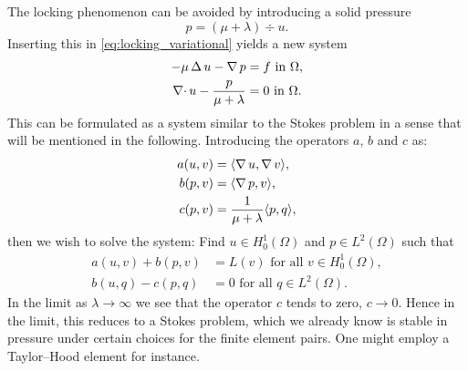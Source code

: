 The locking phenomenon can be avoided by introducing a solid pressure 
\begin{equation}
    p = (\mu + \lambda) \div u.
\end{equation}
Inserting this in \cref{eq:locking_variational} yields a new system
\begin{align}
    -\mu \operatorname{\mathop{}\!\Delta} u - \operatorname{\mathop{}\!\nabla} p &= f \text{ in } \Omega, \\
    \operatorname{\mathop{}\!\nabla \cdot} u - \frac{p}{\mu + \lambda} &= 0 \text{ in } \Omega.
\end{align}
This can be formulated as a system similar to the Stokes problem in a sense
that will be mentioned in the following. Introducing the operators \(a\), \(b\)
and \(c\) as:
\begin{align}
    a(u, v) &= \langle \operatorname{\mathop{}\!\nabla} u, \operatorname{\mathop{}\!\nabla} v  \rangle, \\
    b(p, v) &= \langle \operatorname{\mathop{}\!\nabla} p, v \rangle, \\
    c(p, v) &= \frac{1}{\mu+\lambda} \langle p, q \rangle, 
\end{align}
then we wish to solve the system: Find \( u \in H^1_0(\Omega) \) and \( p \in L^2(\Omega) \)
such that 
\begin{align}
    a(u, v) + b(p, v) &= L(v) \text{ for all } v \in H^1_0(\Omega), \\
    b(u, q) - c(p, q) &= 0 \text{ for all } q \in L^2(\Omega).
\end{align}
In the limit as \( \lambda \to \infty\) we see that the operator \(c \) tends
to zero, \( c \to 0 \). Hence in the limit, this reduces to a Stokes problem,
which we already know is stable in pressure under certain choices for the
finite element pairs.  One might employ a Taylor--Hood element for instance.

